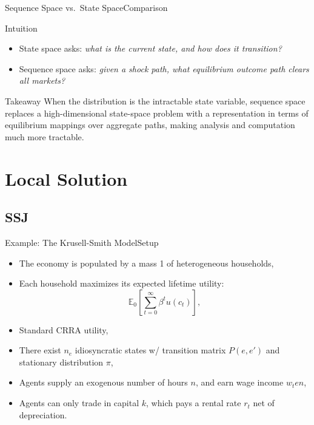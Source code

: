\documentclass[aspectratio=169]{beamer}
\begin{document}
\begin{frame}{Sequence Space vs.\ State Space}{Comparison}

    \begin{block}{Intuition}
        \begin{itemize}
            \item State space asks: \emph{what is the current state, and how does it transition?}
            \item Sequence space asks: \emph{given a shock path, what equilibrium outcome path clears all markets?}
        \end{itemize}
    \end{block}

    \begin{block}{Takeaway}
        When the distribution is the intractable state variable, sequence space replaces a high-dimensional state-space problem with a representation in terms of \alert{equilibrium mappings over aggregate paths}, making analysis and computation much more tractable.
    \end{block}
\end{frame}



\section{Local Solution}
\subsection{SSJ}
\begin{frame}{Example: The Krusell-Smith Model}{Setup}
    \begin{itemize}
        \item The economy is populated by a mass 1 of heterogeneous households,
        \item Each household maximizes its expected lifetime utility:
              \[
                  \mathbb{E}_0\left[\sum_{t=0}^{\infty} \beta^t u(c_t)\right],
              \]
        \item Standard CRRA utility,
        \item There exist $n_e$ idiosyncratic states w/ transition matrix $P(e,e')$ and stationary distribution $\pi$,
        \item Agents supply an exogenous number of hours $n$, and earn wage income $w_t e n$,
        \item Agents can only trade in capital $k$, which pays a rental rate $r_t$ net of depreciation.
    \end{itemize}


\end{frame}
\end{document}
